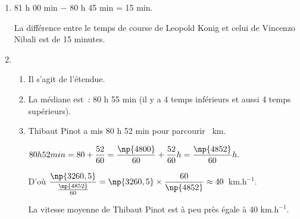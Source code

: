 \begin{enumerate}
\item %
81 h 00 min $-$ 80 h 45 min = 15 min.

La différence entre le temps de course de Leopold Konig et celui de Vincenzo Nibali est de 15 minutes.
\item %
	\begin{enumerate}
		\item %
Il s'agit de l'étendue.
		\item %
La médiane est : 80 h 55 min (il y a 4 temps inférieurs et aussi 4 temps supérieurs).
		\item %
		
Thibaut Pinot a mis 80 h 52 min pour parcourir ~km.

$80 h 52 min = 80 + \dfrac{52}{60} = \dfrac{\np{4800}}{60} + \dfrac{52}{60} h = \dfrac{\np{4852}}{60} h.$

D'où $\dfrac{\np{3260,5}}{\frac{\np{4852}}{60}} =  \np{3260,5} \times \dfrac{60}{\np{4852}} \approx 40$~km.h$^{- 1}$.

La vitesse moyenne de Thibaut Pinot est à peu près égale à 40 km.h$^{- 1}$.
	\end{enumerate}
\end{enumerate}

\vspace{0,5cm}

